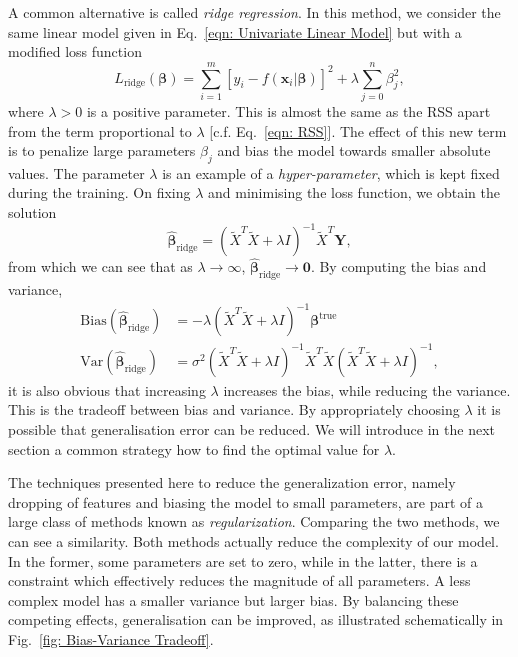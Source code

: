 A common alternative is called \emph{ridge regression}. In this method, we consider the same linear model given in Eq.~\eqref{eqn: Univariate Linear Model} but with a modified loss function
\begin{equation}\label{eqn: Ridge}
    L_{\textrm{ridge}}(\bm{\beta}) = \sum_{i=1}^{m} \left[y_{i} -   f(\boldsymbol{x}_i|\bm{\beta})\right]^{2} + \lambda \sum_{j=0}^{n} \beta_{j}^{2},
\end{equation}
where $\lambda > 0$ is a positive parameter. 
This is almost the same as the RSS apart from the term proportional to $\lambda$ [c.f. Eq.~\eqref{eqn: RSS}]. The effect of this new term is to penalize large parameters $\beta_j$ and bias the model towards smaller absolute values. The parameter $\lambda$ is an example of a \emph{hyper-parameter}, which is kept fixed during the training. On fixing $\lambda$ and minimising the loss function, we obtain the solution
\begin{equation} \label{eqn: Ridge Solution}
    \hat{\bm{\beta}}_{\textrm{ridge}} = (\widetilde{X}^{T}\widetilde{X} + \lambda I)^{-1}\widetilde{X}^{T}\bm{Y},
\end{equation}
from which we can see that as $\lambda \rightarrow \infty$, $\hat{\bm{\beta}}_{\textrm{ridge}} \rightarrow \bm{0}$.
By computing the bias and variance,
\begin{equation}\label{eqn: Ridge Bias-Variance}
    \begin{split}
        \textrm{Bias}(\hat{\bm{\beta}}_{\textrm{ridge}}) &= -\lambda (\widetilde{X}^{T}\widetilde{X} + \lambda I)^{-1} \bm{\beta}^{\textrm{true}}\\
        \textrm{Var}(\hat{\bm{\beta}}_{\textrm{ridge}}) &= \sigma^2 (\widetilde{X}^{T}\widetilde{X} + \lambda I)^{-1} \widetilde{X}^{T}\widetilde{X}(\widetilde{X}^{T}\widetilde{X} + \lambda I)^{-1},
    \end{split}
\end{equation}
it is also obvious that increasing $\lambda$ increases the bias, while reducing the variance. This is the tradeoff between bias and variance. By appropriately choosing $\lambda$ it is possible that generalisation error can be reduced. We will introduce in the next section a common strategy how to find the optimal value for $\lambda$.

The techniques presented here to reduce the generalization error, namely dropping of features and biasing the model to small parameters, are part of a large class of methods known as \emph{regularization}. Comparing the two methods, we can see a similarity. Both methods actually reduce the complexity of our model. In the former, some parameters are set to zero, while in the latter, there is a constraint which effectively reduces the magnitude of all parameters. A less complex model has a smaller variance but larger bias. By balancing these competing effects, generalisation can be improved, as illustrated schematically in Fig.~\ref{fig: Bias-Variance Tradeoff}.

